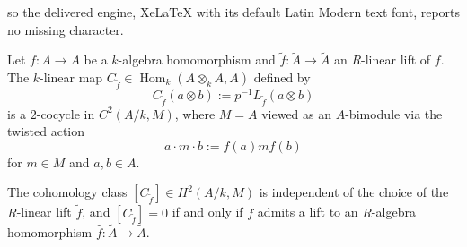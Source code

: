\documentclass[10pt,a4paper]{amsart}
\newcommand{\Hom}{\operatorname{Hom}}
\newcommand{\lA}{\widetilde{A}}
\newcommand{\lf}{\widetilde{f}}
\begin{document}
so the delivered engine, XeLaTeX with its default Latin Modern text font, reports no missing character.
\begin{proposition}\label{proposition:cocycle}
Let $f: A \to A$ be a $k$-algebra homomorphism and $\lf: \lA \to \lA$ an $R$-linear lift of $f$. The $k$-linear map $C_{\lf} \in \Hom_k(A \otimes_k A, A)$ defined by 
$$
C_{\lf}(a \otimes b) := p^{-1} L_{\lf}(a \otimes b) 
$$ 
is a $2$-cocycle in $C^2(A/k, M)$, where $M = A$ viewed as an $A$-bimodule via the twisted action
$$
a \cdot m \cdot b := f(a) m f(b)
$$
for $m \in M$ and $a, b \in A$. 

The cohomology class $[C_{\lf}] \in H^2(A/k, M)$ is independent of the choice of the $R$-linear lift $\lf$, and $[C_{\lf}] = 0$ if and only if $f$ admits a lift to an $R$-algebra homomorphism $\widehat{f}: \lA \to \lA$.
\end{proposition}
\end{document}
